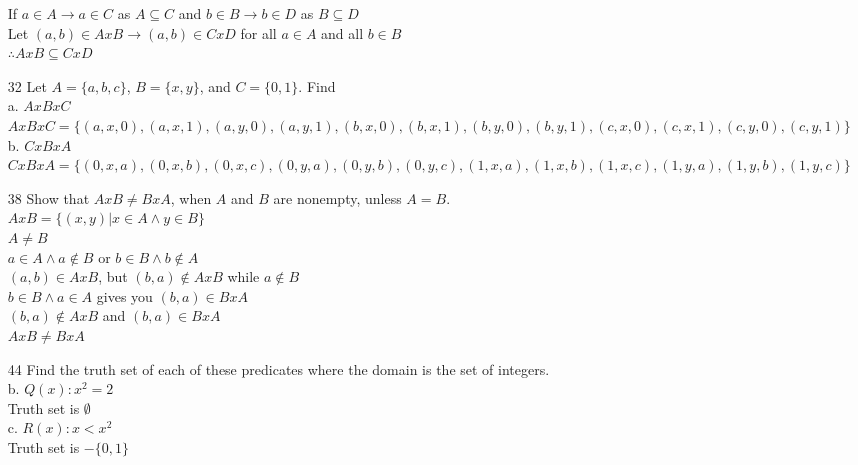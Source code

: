 \documentclass[a4paper]{article}
\newcommand\tab[1][0.5cm]{\hspace*{#1}}
\begin{document}
\begin{itemize}
  \tab If $a \in A \rightarrow a \in C$ as $A \subseteq C$ and $b \in B \rightarrow b \in D$ as $B \subseteq D$ \\
  \tab Let $(a, b) \in A x B \rightarrow (a, b) \in C x D$ for all $a \in A$ and all $b \in B$ \\
  \tab $\therefore A x B \subseteq C x D$
  \item[32] Let $A = \{a, b, c\}$, $B = \{x, y\}$, and $C = \{0, 1\}$. Find \\
    a. $A x B x C$ \\
    \tab $A x B x C = \{(a, x, 0), (a, x, 1), (a, y, 0), (a, y, 1), (b, x, 0), (b, x, 1), (b, y, 0), (b, y, 1), (c, x, 0), (c, x, 1), (c, y, 0), (c, y, 1)\}$ \\
    b. $C x B x A$ \\
    \tab $C x B x A = \{(0, x, a), (0, x, b), (0, x, c), (0, y, a), (0, y, b), (0, y, c), (1, x, a), (1, x, b), (1, x, c), (1, y, a), (1, y, b), (1, y, c)\}$
  \item[38] Show that $A x B \neq B x A$, when $A$ and $B$ are nonempty, unless $A = B$. \\
  \tab $A x B = \{(x, y)|x \in A \land y \in B\}$ \\
  \tab $A \neq B$ \\
  \tab $a \in A \land a \notin B$ or $b \in B \land b \notin A$ \\
  \tab $(a, b) \in A x B$, but $(b, a) \notin A x B$ while $a \notin B$ \\
  \tab $b \in B \land a \in A$ gives you $(b, a) \in B x A$ \\
  \tab $(b, a) \notin A x B$ and $(b, a) \in B x A$ \\
  \tab $A x B \neq B x A$
  \item[44] Find the truth set of each of these predicates where the domain is the set of integers. \\
    b. $Q(x): x^2 = 2$ \\
    \tab Truth set is $\emptyset$ \\
    c. $R(x): x < x^2$ \\
    \tab Truth set is $-\{0, 1\}$
\end{itemize}
\end{document}

